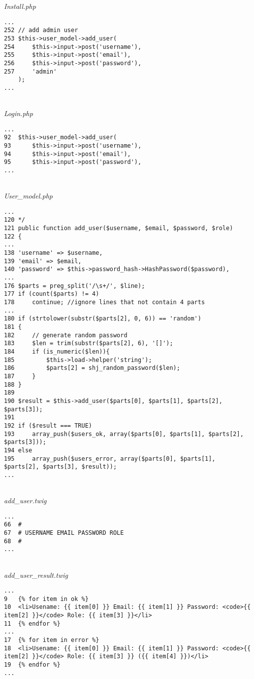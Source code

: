 \textit{Install.php}
\begin{lstlisting}[basicstyle=\ttfamily, frame=single,
columns=fullflexible, keepspaces=true, breaklines=true]
...
252	// add admin user
253	$this->user_model->add_user(
254		$this->input->post('username'),
255		$this->input->post('email'),
256		$this->input->post('password'),
257		'admin'
	);
...
\end{lstlisting}
~\\
\textit{Login.php}
\begin{lstlisting}[basicstyle=\ttfamily, frame=single,
columns=fullflexible, keepspaces=true, breaklines=true]
...
92	$this->user_model->add_user(
93		$this->input->post('username'),
94		$this->input->post('email'),
95		$this->input->post('password'),
...
\end{lstlisting}
~\\
\textit{User\_model.php}
\begin{lstlisting}[basicstyle=\ttfamily, frame=single,
columns=fullflexible, keepspaces=true, breaklines=true]
...
120	*/
121	public function add_user($username, $email, $password, $role)
122	{
...
138	'username' => $username,
139	'email' => $email,
140	'password' => $this->password_hash->HashPassword($password),
...
176	$parts = preg_split('/\s+/', $line);
177	if (count($parts) != 4)
178		continue; //ignore lines that not contain 4 parts
...
180	if (strtolower(substr($parts[2], 0, 6)) == 'random')
181	{
182		// generate random password
183		$len = trim(substr($parts[2], 6), '[]');
184		if (is_numeric($len)){
185			$this->load->helper('string');
186			$parts[2] = shj_random_password($len);
187		}
188	}
189	
190	$result = $this->add_user($parts[0], $parts[1], $parts[2], $parts[3]);
191	
192	if ($result === TRUE)
193		array_push($users_ok, array($parts[0], $parts[1], $parts[2], $parts[3]));
194	else
195		array_push($users_error, array($parts[0], $parts[1], $parts[2], $parts[3], $result));
...
\end{lstlisting}
~\\
\textit{add\_user.twig}
\begin{lstlisting}[basicstyle=\ttfamily, frame=single,
columns=fullflexible, keepspaces=true, breaklines=true]
...
66	#
67	# USERNAME EMAIL PASSWORD ROLE
68	#
...
\end{lstlisting}
~\\
\textit{add\_user\_result.twig}
\begin{lstlisting}[basicstyle=\ttfamily, frame=single,
columns=fullflexible, keepspaces=true, breaklines=true]
...
9	{% for item in ok %}
10	<li>Usename: {{ item[0] }} Email: {{ item[1] }} Password: <code>{{ item[2] }}</code> Role: {{ item[3] }}</li>
11	{% endfor %}
...
17	{% for item in error %}
18	<li>Usename: {{ item[0] }} Email: {{ item[1] }} Password: <code>{{ item[2] }}</code> Role: {{ item[3] }} ({{ item[4] }})</li>
19	{% endfor %}
...
\end{lstlisting}
